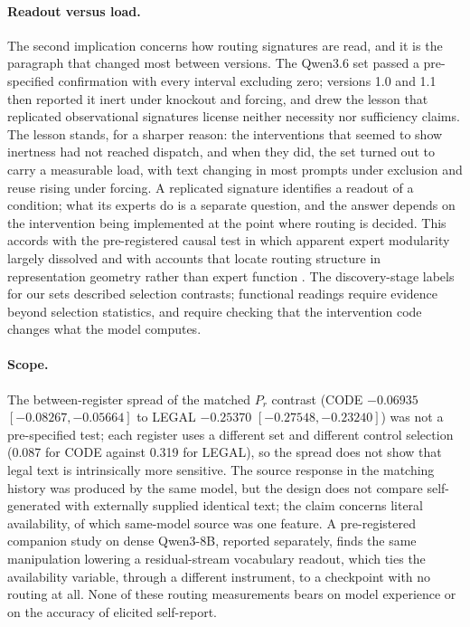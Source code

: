\documentclass[10pt,a4paper,twocolumn]{article}
\begin{document}
\paragraph{Readout versus load.}
The second implication concerns how routing signatures are read, and it is
the paragraph that changed most between versions. The Qwen3.6 set passed a
pre-specified confirmation with every interval excluding zero; versions 1.0
and 1.1 then reported it inert under knockout and forcing, and drew the
lesson that replicated observational signatures license neither necessity
nor sufficiency claims. The lesson stands, for a sharper reason: the
interventions that seemed to show inertness had not reached dispatch, and
when they did, the set turned out to carry a measurable load, with text
changing in most prompts under exclusion and reuse rising under forcing. A
replicated signature identifies a readout of a condition; what its experts
do is a separate question, and the answer depends on the intervention being
implemented at the point where routing is decided. This accords with the
pre-registered causal test in which apparent expert modularity largely
dissolved \cite{salomone2026} and with accounts that locate routing
structure in representation geometry rather than expert function
\cite{wang2026myth}. The discovery-stage labels for our sets described
selection contrasts; functional readings require evidence beyond selection
statistics, and require checking that the intervention code changes what
the model computes.

\paragraph{Scope.}
The between-register spread of the matched \(P_r\) contrast (CODE
\(-0.06935\) \([-0.08267,-0.05664]\) to LEGAL \(-0.25370\)
\([-0.27548,-0.23240]\)) was not a pre-specified test; each register uses a
different set and different control selection (0.087 for CODE against 0.319
for LEGAL), so the spread does not show that legal text is intrinsically more
sensitive. The source response in the matching history was produced by the
same model, but the design does not compare self-generated with externally
supplied identical text; the claim concerns literal availability, of which
same-model source was one feature. A pre-registered companion study on dense
Qwen3-8B, reported separately, finds the same manipulation lowering a
residual-stream vocabulary readout, which ties the availability variable,
through a different instrument, to a checkpoint with no routing at all. None
of these routing measurements bears on model experience or on the accuracy of
elicited self-report.
\end{document}
